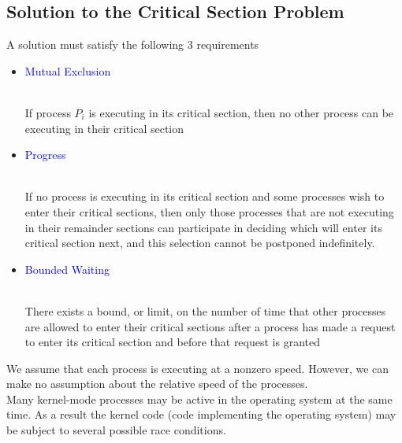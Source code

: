 \documentclass{book/custombook}
\begin{document}
            \subsection{Solution to the Critical Section Problem}
                A solution must satisfy the following 3 requirements
                \begin{itemize}
                    \item \textcolor{blue}{Mutual Exclusion}\\\\
                        \hspace*{1em}%
                            \begin{minipage}{0.8\textwidth}%
                                If process $\textit{P}_{\textit{i}}$ is executing in its critical section, then no other
                                process can be executing in their critical section
                            \end{minipage}%
                    \item \textcolor{blue}{Progress}\\\\
                        \hspace*{1em}%
                            \begin{minipage}{0.8\textwidth}%
                                If no process is executing in its critical section and some processes wish to 
                                enter their critical sections, then only those processes that are not executing in their
                                remainder sections can participate in deciding which will enter its critical section next,
                                and this selection cannot be postponed indefinitely.
                            \end{minipage}%
                    \item \textcolor{blue}{Bounded Waiting}\\\\
                        \hspace*{1em}%
                            \begin{minipage}{0.8\textwidth}%
                                There exists a bound, or limit, on the number of time that other processes are allowed to
                                enter their critical sections after a process has made a request to enter its critical
                                section and before that request is granted
                            \end{minipage}%
                \end{itemize}
           We assume that each process is executing at a nonzero speed. However, we can make no assumption about the
           relative speed of the processes.\\
           Many kernel-mode processes may be active in the operating system at the same time. As a result the kernel code
           (code implementing the operating system) may be subject to several possible race conditions.
\end{document}

